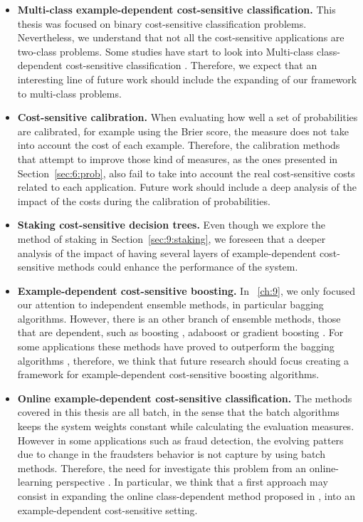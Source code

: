 \begin{itemize}
 \item \textbf{Multi-class example-dependent cost-sensitive classification.} This thesis was 
focused on binary cost-sensitive classification problems. Nevertheless, we understand 
that not all the cost-sensitive applications are two-class problems. Some studies have start to 
look into Multi-class class-dependent cost-sensitive classification \citep{Zhou2010}. Therefore, we 
expect that an interesting line of future work should include the expanding of our framework to 
multi-class problems.

 \item \textbf{Cost-sensitive calibration.} When evaluating how well a set of probabilities are 
calibrated, for example using the Brier score, the measure does not take into account the cost of 
each example. Therefore, the calibration methods that attempt to improve those kind of measures, as 
the ones presented in Section~\ref{sec:6:prob}, also fail to take into account the real 
cost-sensitive costs related to each application. Future work should include a deep analysis of the 
impact of the costs during the calibration of probabilities.

  \item \textbf{Staking cost-sensitive decision trees.} Even though we explore the method of 
staking in Section~\ref{sec:9:staking}, we foreseen that a deeper analysis of the impact of having 
several layers of example-dependent cost-sensitive methods could enhance the performance of the 
system.

  \item \textbf{Example-dependent cost-sensitive boosting.} In \chaptername{~\ref{ch:9}}, we 
only focused our attention to independent ensemble methods, in particular bagging algorithms. 
However, there is an other branch of ensemble methods, those that are dependent, such as 
boosting \citep{Schapire1990}, adaboost \citep{Freund1996} or gradient boosting 
\citep{Friedman2001,Friedman2002}. For some applications these methods have proved to outperform 
the bagging algorithms \citep{Zhou2012}, therefore, we think that future research should focus 
creating a framework for example-dependent cost-sensitive boosting algorithms.

  \item \textbf{Online example-dependent cost-sensitive classification.} The methods covered in 
this thesis are all batch, in the sense that the batch algorithms keeps the system weights constant 
while calculating the evaluation measures. However in some applications such as fraud detection, the 
evolving patters due to change in the fraudsters behavior is not capture by using batch methods. 
Therefore, the need for investigate this problem from an online-learning perspective 
\citep{Pozzolo2014}. In particular, we think that a first approach may consist in expanding the 
online class-dependent method proposed in \citep{Wang2014}, into an example-dependent cost-sensitive 
setting.
\end{itemize}

